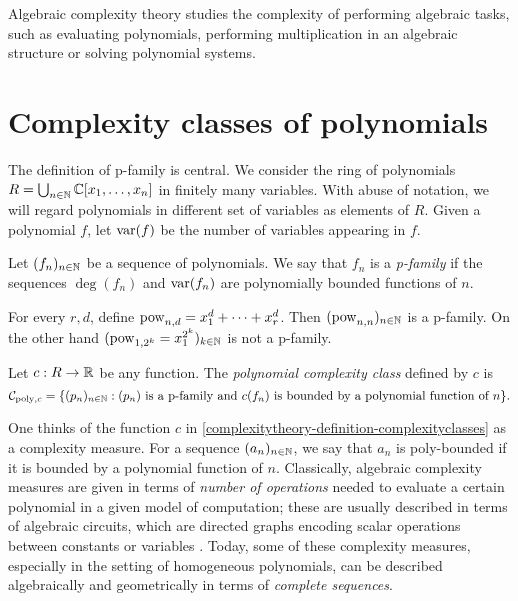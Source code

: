 Algebraic complexity theory studies the complexity of performing algebraic tasks, such as evaluating polynomials, performing multiplication in an algebraic structure or solving polynomial systems. 

\section{Complexity classes of polynomials} 
\label{complexitytheory-section-complexityclassespolynomials}
The definition of p-family is central. We consider the ring of polynomials $R = \bigcup_{n\in \mathbb{N}} \mathbb{C}[x_1 , \ldots , x_n]$ in finitely many variables. With abuse of notation, we will regard polynomials in different set of variables as elements of $R$. Given a polynomial $f$, let $\mathrm{var}(f)$ be the number of variables appearing in $f$.
\begin{definition}
 \label{complexityTheory-definition-pfamily}
 Let $(f_n)_{n \in \mathbb{N}}$ be a sequence of polynomials. We say that $f_n$ is a {\it p-family} if the sequences $\deg(f_n)$ and $\mathrm{var}(f_n)$ are polynomially bounded functions of $n$. 
\end{definition}

\begin{example}
 \label{complexityTheory-example-pfamily}
For every $r ,d$, define $\mathrm{pow}_{n,d} = x_1^d + \cdots + x_r^d$. Then $( \mathrm{pow}_{n,n})_{n \in \mathbb{N}}$ is a p-family. On the other hand $(\mathrm{pow}_{1,2^k} = x_1^{2^k})_{k \in \mathbb{N}}$ is not a p-family.
\end{example}

\begin{definition}
 \label{complexitytheory-definition-complexityclasses}
Let $c : R \to \mathbb{R}$ be any function. The {\it polynomial complexity class} defined by $c$ is 
\[
\mathcal{C}_{\mathrm{poly}, c} = \{ (p_n) _{n \in \mathbb{N}} : (p_n) \text{ is a p-family and $c( f_n)$ is bounded by a polynomial function of $n$}\}.
\] 
\end{definition}
One thinks of the function $c$ in \ref{complexitytheory-definition-complexityclasses} as a complexity measure. For a sequence $(a_n)_{n \in \mathbb{N}}$, we say that $a_n$ is poly-bounded if it is bounded by a polynomial function of $n$. Classically, algebraic complexity measures are given in terms of \emph{number of operations} needed to evaluate a certain polynomial in a given model of computation; these are usually described in terms of algebraic circuits, which are directed graphs encoding scalar operations between constants or variables \cite{Val79,Tod92}. Today, some of these complexity measures, especially in the setting of homogeneous polynomials, can be described algebraically and geometrically in terms of \emph{complete sequences}. 

